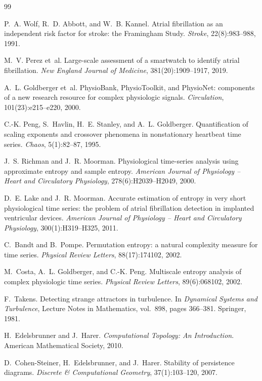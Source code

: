 \documentclass[11pt]{article}
\begin{document}
\begin{thebibliography}{99}
\small

P.~A. Wolf, R.~D. Abbott, and W.~B. Kannel.
Atrial fibrillation as an independent risk factor for stroke: the
Framingham Study.
\emph{Stroke}, 22(8):983--988, 1991.

M.~V. Perez et~al.
Large-scale assessment of a smartwatch to identify atrial fibrillation.
\emph{New England Journal of Medicine}, 381(20):1909--1917, 2019.

A.~L. Goldberger et~al.
PhysioBank, PhysioToolkit, and PhysioNet: components of a new research
resource for complex physiologic signals.
\emph{Circulation}, 101(23):e215--e220, 2000.

C.-K. Peng, S.~Havlin, H.~E. Stanley, and A.~L. Goldberger.
Quantification of scaling exponents and crossover phenomena in
nonstationary heartbeat time series.
\emph{Chaos}, 5(1):82--87, 1995.

J.~S. Richman and J.~R. Moorman.
Physiological time-series analysis using approximate entropy and sample
entropy.
\emph{American Journal of Physiology -- Heart and Circulatory Physiology},
278(6):H2039--H2049, 2000.

D.~E. Lake and J.~R. Moorman.
Accurate estimation of entropy in very short physiological time series:
the problem of atrial fibrillation detection in implanted ventricular
devices.
\emph{American Journal of Physiology -- Heart and Circulatory Physiology},
300(1):H319--H325, 2011.

C.~Bandt and B.~Pompe.
Permutation entropy: a natural complexity measure for time series.
\emph{Physical Review Letters}, 88(17):174102, 2002.

M.~Costa, A.~L. Goldberger, and C.-K. Peng.
Multiscale entropy analysis of complex physiologic time series.
\emph{Physical Review Letters}, 89(6):068102, 2002.

F.~Takens.
Detecting strange attractors in turbulence.
In \emph{Dynamical Systems and Turbulence}, Lecture Notes in Mathematics,
vol.~898, pages 366--381. Springer, 1981.

H.~Edelsbrunner and J.~Harer.
\emph{Computational Topology: An Introduction}.
American Mathematical Society, 2010.

D.~Cohen-Steiner, H.~Edelsbrunner, and J.~Harer.
Stability of persistence diagrams.
\emph{Discrete \& Computational Geometry}, 37(1):103--120, 2007.


\end{thebibliography}
\end{document}
